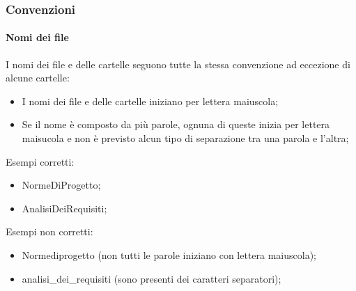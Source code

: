 \subsubsection{Convenzioni}

\paragraph{Nomi dei file}
I nomi dei file e delle cartelle seguono tutte la stessa convenzione ad eccezione di alcune cartelle:

\begin{itemize}

	\item I nomi dei file e delle cartelle iniziano per lettera maiuscola;
	
	\item Se il nome è composto da più parole, ognuna di queste inizia per lettera maisucola e non è previsto alcun tipo di separazione tra una parola e l'altra;
	
	
\end{itemize}

Esempi corretti:

\begin{itemize}

	\item NormeDiProgetto;
	
	\item AnalisiDeiRequisiti;
	
\end{itemize}

Esempi non corretti:

\begin{itemize}

	\item Normediprogetto (non tutti le parole iniziano con lettera maiuscola);
	
	\item analisi\_dei\_requisiti (sono presenti dei caratteri separatori);
\end{itemize}

